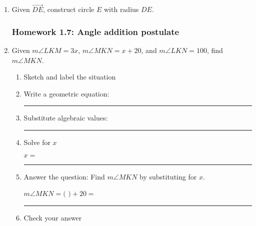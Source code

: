 \documentclass[12pt, oneside]{article}
\begin{document}
\begin{enumerate}
    \item Given $\overrightarrow{DE}$, construct circle $E$ with radius $DE$.
    \vspace{3cm}
    \begin{center}
    \end{center}

\newpage
\subsubsection*{Homework 1.7: Angle addition postulate}
\item Given $m\angle LKM = 3x$, $m\angle MKN = x+20$, and $m\angle LKN = 100$, find $m\angle MKN$.  \vspace{1cm}
  \begin{enumerate}
    \item Sketch and label the situation
    \begin{flushright}
    \end{flushright}
    \vspace{1cm}

  \item Write a geometric equation: \rule{5cm}{0.15mm} \vspace{1cm}
  \item Substitute algebraic values: \rule{5cm}{0.15mm}
  \item Solve for $x$
    \vspace{3cm}
    \begin{center} $x=$ \rule{1cm}{0.15mm} \end{center}
    \item Answer the question: Find $m\angle MKN$ by substituting for $x$.\\
    \begin{center} $m\angle MKN=($ \hspace{1cm} $)+20=$ \rule{1cm}{0.15mm} \end{center}
    \item Check your answer
  \end{enumerate}
  \vspace{2cm}


\end{enumerate}
\end{document}
